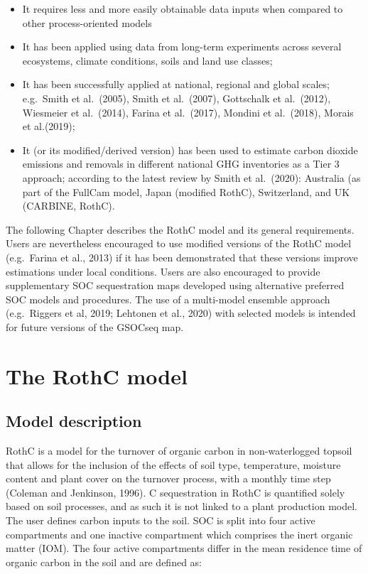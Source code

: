 \documentclass[
  10pt,
  b5paper,
]{book}
\providecommand{\tightlist}{%
  \setlength{\itemsep}{0pt}\setlength{\parskip}{0pt}}
\begin{document}
\begin{itemize}
\tightlist
\item
  It requires less and more easily obtainable data inputs when compared to other process-oriented models
\item
  It has been applied using data from long-term experiments across several ecosystems, climate conditions, soils and land use classes;
\item
  It has been successfully applied at national, regional and global scales; e.g.~Smith et al.~(2005), Smith et al.~(2007), Gottschalk et al.~(2012), Wiesmeier et al.~(2014), Farina et al.~(2017), Mondini et al.~(2018), Morais et al.(2019);
\item
  It (or its modified/derived version) has been used to estimate carbon dioxide emissions and removals in different national GHG inventories as a Tier 3 approach; according to the latest review by Smith et al.~(2020): Australia (as part of the FullCam model, Japan (modified RothC), Switzerland, and UK (CARBINE, RothC).
\end{itemize}

The following Chapter describes the RothC model and its general requirements. Users are nevertheless encouraged to use modified versions of the RothC model (e.g.~Farina et al., 2013) if it has been demonstrated that these versions improve estimations under local conditions. Users are also encouraged to provide supplementary SOC sequestration maps developed using alternative preferred SOC models and procedures. The use of a multi-model ensemble approach (e.g.~Riggers et al, 2019; Lehtonen et al., 2020) with selected models is intended for future versions of the GSOCseq map.

\hypertarget{the-rothc-model}{%
\chapter{\textbar{} The RothC model}\label{the-rothc-model}}

\hypertarget{model-description}{%
\section{Model description}\label{model-description}}

RothC is a model for the turnover of organic carbon in non-waterlogged topsoil that allows for the inclusion of the effects of soil type, temperature, moisture content and plant cover on the turnover process, with a monthly time step (Coleman and Jenkinson, 1996). C sequestration in RothC is quantified solely based on soil processes, and as such it is not linked to a plant production model. The user defines carbon inputs to the soil. SOC is split into four active compartments and one inactive compartment which comprises the inert organic matter (IOM). The four active compartments differ in the mean residence time of organic carbon in the soil and are defined as:
\end{document}
